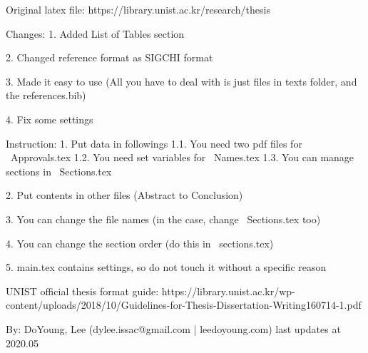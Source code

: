 Original latex file: https://library.unist.ac.kr/research/thesis

Changes:
1. Added List of Tables section

2. Changed reference format as SIGCHI format

3. Made it easy to use (All you have to deal with is just files in texts folder, and the references.bib)

4. Fix some settings

Instruction:
1. Put data in followings
 1.1. You need two pdf files for ~Approvals.tex
 1.2. You need set variables for ~Names.tex
 1.3. You can manage sections in ~Sections.tex

2. Put contents in other files (Abstract to Conclusion)

3. You can change the file names (in the case, change ~Sections.tex too)

4. You can change the section order (do this in ~sections.tex)

5. main.tex contains settings, so do not touch it without a specific reason


UNIST official thesis format guide:
https://library.unist.ac.kr/wp-content/uploads/2018/10/Guidelines-for-Thesis-Dissertation-Writing160714-1.pdf


By:
DoYoung, Lee (dylee.issac@gmail.com | leedoyoung.com)
last updates at 2020.05

